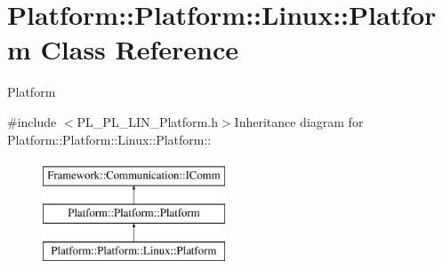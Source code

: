 \hypertarget{classPlatform_1_1Platform_1_1Linux_1_1Platform}{
\section{Platform::Platform::Linux::Platform Class Reference}
\label{classPlatform_1_1Platform_1_1Linux_1_1Platform}
}


Platform  


{\ttfamily \#include $<$PL\_\-PL\_\-LIN\_\-Platform.h$>$}Inheritance diagram for Platform::Platform::Linux::Platform::\begin{figure}[H]
\begin{center}
\leavevmode
\includegraphics[height=3cm]{classPlatform_1_1Platform_1_1Linux_1_1Platform}
\end{center}
\end{figure}
